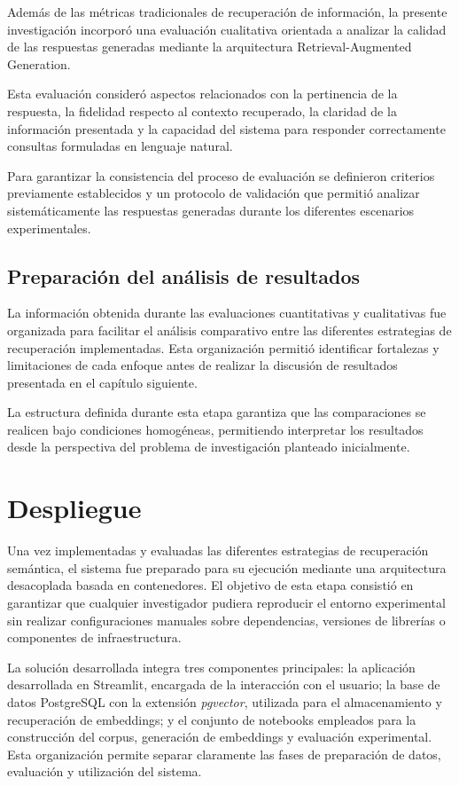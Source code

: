 Además de las métricas tradicionales de recuperación de información, la presente investigación incorporó una evaluación cualitativa orientada a analizar la calidad de las respuestas generadas mediante la arquitectura Retrieval-Augmented Generation.

Esta evaluación consideró aspectos relacionados con la pertinencia de la respuesta, la fidelidad respecto al contexto recuperado, la claridad de la información presentada y la capacidad del sistema para responder correctamente consultas formuladas en lenguaje natural.

Para garantizar la consistencia del proceso de evaluación se definieron criterios previamente establecidos y un protocolo de validación que permitió analizar sistemáticamente las respuestas generadas durante los diferentes escenarios experimentales.

\subsection{Preparación del análisis de resultados}

La información obtenida durante las evaluaciones cuantitativas y cualitativas fue organizada para facilitar el análisis comparativo entre las diferentes estrategias de recuperación implementadas. Esta organización permitió identificar fortalezas y limitaciones de cada enfoque antes de realizar la discusión de resultados presentada en el capítulo siguiente.

La estructura definida durante esta etapa garantiza que las comparaciones se realicen bajo condiciones homogéneas, permitiendo interpretar los resultados desde la perspectiva del problema de investigación planteado inicialmente.


\section{Despliegue}

Una vez implementadas y evaluadas las diferentes estrategias de recuperación semántica, el sistema fue preparado para su ejecución mediante una arquitectura desacoplada basada en contenedores. El objetivo de esta etapa consistió en garantizar que cualquier investigador pudiera reproducir el entorno experimental sin realizar configuraciones manuales sobre dependencias, versiones de librerías o componentes de infraestructura.

La solución desarrollada integra tres componentes principales: la aplicación desarrollada en Streamlit, encargada de la interacción con el usuario; la base de datos PostgreSQL con la extensión \textit{pgvector}, utilizada para el almacenamiento y recuperación de embeddings; y el conjunto de notebooks empleados para la construcción del corpus, generación de embeddings y evaluación experimental. Esta organización permite separar claramente las fases de preparación de datos, evaluación y utilización del sistema.


